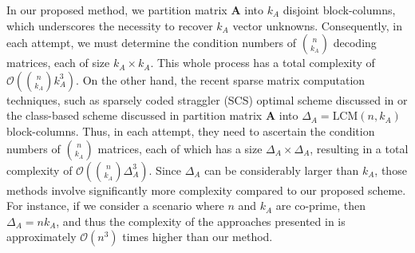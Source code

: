 \documentclass[conference]{IEEEtran}
\theoremstyle{definition}
\newcommand{\calO}{\mathcal{O}}
\newcommand{\bfA}{\mathbf{A}}
\begin{document}
In our proposed method, we partition matrix $\bfA$ into $k_A$ disjoint block-columns, which underscores the necessity to recover $k_A$ vector unknowns. Consequently, in each attempt, we must determine the condition numbers of ${n \choose k_A}$ decoding matrices, each of size $k_A \times k_A$. This whole process has a total complexity of $\calO\left( {n \choose k_A} k_A^3\right)$. On the other hand, the recent sparse matrix computation techniques, such as sparsely coded straggler (SCS) optimal scheme discussed in \cite{das2020coded} or the class-based scheme discussed in \cite{dasunifiedtreatment} partition matrix $\bfA$ into $\Delta_A = \textrm{LCM}(n, k_A)$ block-columns. Thus, in each attempt, they need to ascertain the condition numbers of ${n \choose k_A}$ matrices, each of which has a size $\Delta_A \times \Delta_A$, resulting in a total complexity of $\calO\left( {n \choose k_A} \Delta_A^3\right)$. Since $\Delta_A$ can be considerably larger than $k_A$, those methods involve significantly more complexity compared to our proposed scheme. For instance, if we consider a scenario where $n$ and $k_A$ are co-prime, then $\Delta_A = n k_A$, and thus the complexity of the approaches presented in \cite{das2020coded, dasunifiedtreatment} is approximately $\calO\left( n^3 \right)$ times higher than our method.

\end{document}

